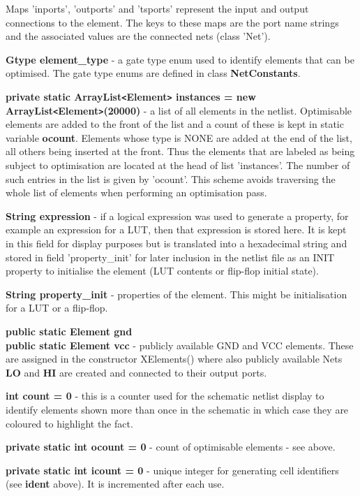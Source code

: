 Maps 'inports', 'outports' and 'tsports' represent the input and output
connections to the element. The keys to these maps are the port name
strings and the associated values are the connected nets (class 'Net').


{\bf Gtype element\_type} - a gate type enum used to identify elements
that can be optimised. The gate type enums are defined in class {\bf
NetConstants}.

{\bf private static ArrayList\verb'<'Element\verb'>' instances = new
ArrayList\verb'<'Element\verb'>'(20000)} - a list of all elements in the
netlist. Optimisable elements are added to the front of the list and a
count of these is kept in static variable {\bf ocount}.
Elements whose type is NONE are added at the end of the list, all others
being inserted at the front. Thus the elements that are labeled as being
subject to optimisation are located at the head of list 'instances'. The
number of such entries in the list is given by 'ocount'. This scheme avoids
traversing the whole list of elements when performing an optimisation pass.

{\bf String expression} - if a logical expression was used to generate a
property, for example an expression for a LUT, then that expression is
stored here. It is kept in this field for display purposes but is
translated into a hexadecimal string and stored in field 'property\_init'
for later inclusion in the netlist file as an INIT property to initialise
the element (LUT contents or flip-flop initial state).

{\bf String property\_init} - properties of the element. This might be
initialisation for a LUT or a flip-flop.

{\bf public static Element gnd} \\
{\bf public static Element vcc} -
publicly available GND and VCC elements. These are assigned in the
constructor XElements() where also publicly available Nets {\bf LO} and
{\bf HI} are created and connected to their output ports.

{\bf int count = 0} - this is a counter used for the schematic netlist
display to identify elements shown more than once in the schematic in
which case they are coloured to highlight the fact.

{\bf private static int ocount = 0} - count of optimisable elements -
see above.

{\bf private static int icount = 0} - unique integer for generating cell
identifiers (see {\bf ident} above). It is incremented after each use.

